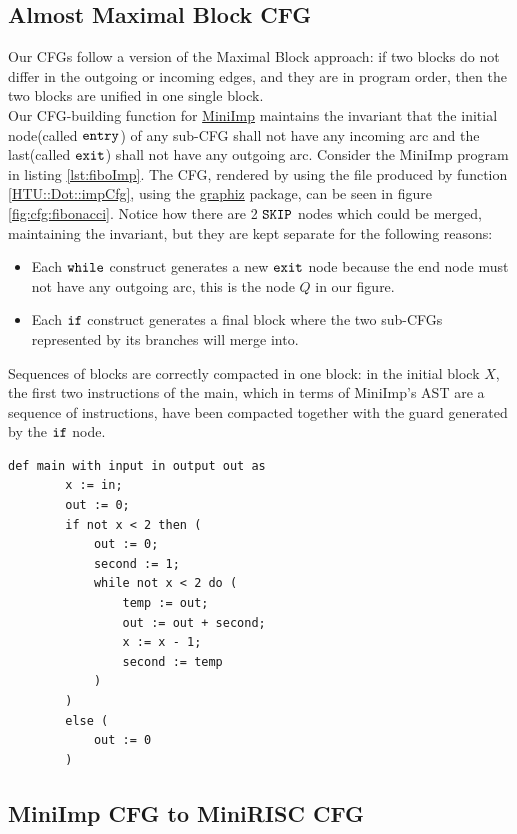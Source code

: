 \documentclass[a4paper,11pt]{report}
\begin{document}
\subsection{Almost Maximal Block CFG}
Our CFGs follow a version of the Maximal Block approach:  if two blocks do not differ in the outgoing or incoming edges, and they are in program order, then the two blocks are unified in one single block.
\\
Our CFG-building function for \hyperref[Section::MiniImp]{MiniImp} maintains the invariant that the initial node(called $\verb|entry|$) of any sub-CFG shall not have any incoming arc and the last(called $\verb|exit|$) shall not have any outgoing arc.
Consider the MiniImp program in listing \ref{lst:fiboImp}. The CFG, rendered by using the file produced by function \ref{HTU::Dot::impCfg}, using the \href{https://graphviz.org/download/}{graphiz} package, can be seen in figure \ref{fig:cfg:fibonacci}.
Notice how there are 2 $\verb|SKIP|$ nodes which could be merged, maintaining the invariant, but they are kept separate for the following reasons:
\begin{itemize}
  \item Each $\verb|while|$ construct generates a new $\verb|exit|$ node because the end node must not have any outgoing arc, this is the node $Q$ in our figure.
  \item Each $\verb|if|$ construct generates a final block where the two sub-CFGs represented by its branches will merge into. 
 \end{itemize}
Sequences of blocks are correctly compacted in one block: in the initial block $X$, the first two instructions of the main, which in terms of MiniImp's AST are a sequence of instructions, have been compacted together with the guard generated by the $\verb|if|$ node.

\begin{lstlisting}[caption={N-th Fibonacci number in MiniImp}, captionpos=b, label={lst:fiboImp}]
    def main with input in output out as
        x := in;
        out := 0;
        if not x < 2 then (
            out := 0;
            second := 1;
            while not x < 2 do (
                temp := out;
                out := out + second;
                x := x - 1;
                second := temp
            )
        )
        else (
            out := 0
        )
\end{lstlisting}


\subsection{MiniImp CFG to MiniRISC CFG}
\end{document}
